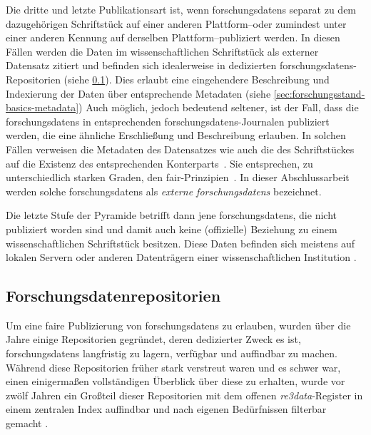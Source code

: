 Die dritte und letzte Publikationsart ist, wenn \glspl{forschungsdaten} separat zu dem dazugehörigen Schriftstück auf einer anderen Plattform--oder zumindest unter einer anderen Kennung auf derselben Plattform--publiziert werden.
In diesen Fällen werden die Daten im wissenschaftlichen Schriftstück als externer Datensatz zitiert und befinden sich idealerweise in dedizierten \glspl{forschungsdaten}-Repositorien (siehe \cref{sec:forschungsstand-basics-repositories}).
Dies erlaubt eine eingehendere Beschreibung und Indexierung der Daten über entsprechende Metadaten (siehe \cref{sec:forschungsstand-basics-metadata})
Auch möglich, jedoch bedeutend seltener, ist der Fall, dass die \glspl{forschungsdaten} in entsprechenden \glspl{forschungsdaten}-Journalen  publiziert werden, die eine ähnliche Erschließung und Beschreibung erlauben.
In solchen Fällen verweisen die Metadaten des Datensatzes wie auch die des Schriftstückes auf die Existenz des entsprechenden Konterparts~\autocite{ReillyEtAl2011}.
Sie entsprechen, zu unterschiedlich starken Graden, den \gls{fair}-Prinzipien~\autocite[vgl.][]{ReillyEtAl2011}.
In dieser Abschlussarbeit werden solche \glspl{forschungsdaten} als \textit{externe \glspl{forschungsdaten}} bezeichnet.\pagebreak

Die letzte Stufe der Pyramide betrifft dann jene \glspl{forschungsdaten}, die nicht publiziert worden sind und damit auch keine (offizielle) Beziehung zu einem wissenschaftlichen Schriftstück besitzen.
Diese Daten befinden sich meistens auf lokalen Servern oder anderen Datenträgern einer wissenschaftlichen Institution \autocite{ReillyEtAl2011}.


\subsection{Forschungsdatenrepositorien}\label{sec:forschungsstand-basics-repositories}
Um eine \gls{fair}e Publizierung von \glspl{forschungsdaten} zu erlauben, wurden über die Jahre einige Repositorien gegründet, deren dedizierter Zweck es ist, \glspl{forschungsdaten} langfristig zu lagern, verfügbar und auffindbar zu machen.
Während diese Repositorien früher stark verstreut waren und es schwer war, einen einigermaßen vollständigen Überblick über diese zu erhalten, wurde vor zwölf Jahren ein Großteil dieser Repositorien mit dem offenen \textit{re3data}-Register in einem zentralen Index auffindbar und nach eigenen Bedürfnissen filterbar gemacht \autocite{Pampel2013}.

